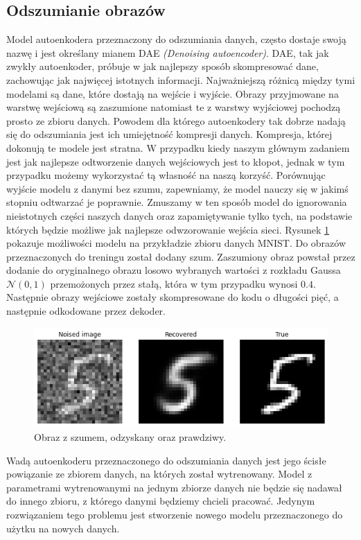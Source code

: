 \documentclass[a4paper,12pt]{book} %
\begin{document}
\subsection{Odszumianie obrazów}
Model autoenkodera przeznaczony do odszumiania danych, często dostaje swoją nazwę i jest określany mianem DAE \textit{(Denoising autoencoder)}. DAE, tak jak zwykły autoenkoder, próbuje w jak najlepszy sposób skompresować dane, zachowując jak najwięcej istotnych informacji. Najważniejszą różnicą między tymi modelami są dane, które dostają na wejście i wyjście. Obrazy przyjmowane na warstwę wejściową są zaszumione natomiast te z warstwy wyjściowej pochodzą prosto ze zbioru danych.
Powodem dla którego autoenkodery tak dobrze nadają się do odszumiania jest ich umiejętność kompresji danych. Kompresja, której dokonują te modele jest stratna. W przypadku kiedy naszym głównym zadaniem jest jak najlepsze odtworzenie danych wejściowych jest to kłopot, jednak w tym przypadku możemy wykorzystać tą własność na naszą korzyść. Porównując wyjście modelu z danymi bez szumu, zapewniamy, że model nauczy się w jakimś stopniu odtwarzać je poprawnie. Zmuszamy w ten sposób model do ignorowania nieistotnych części naszych danych oraz zapamiętywanie tylko tych, na podstawie których będzie możliwe jak najlepsze odwzorowanie wejścia sieci.
Rysunek \ref{fig:noisedae} pokazuje możliwości modelu na przykładzie zbioru danych MNIST. Do obrazów przeznaczonych do treningu został dodany szum. Zaszumiony obraz powstał przez dodanie do oryginalnego obrazu losowo wybranych wartości z rozkładu Gaussa $\mathcal{N}(0,1)$ przemożonych przez stałą, która w tym przypadku wynosi $0.4$. Następnie obrazy wejściowe zostały skompresowane do kodu o długości pięć, a następnie odkodowane przez dekoder. 
\begin{figure}[h!]
	\centering\includegraphics[width=14.5cm]{pictures/noised1.png}
	\caption{Obraz z szumem, odzyskany oraz prawdziwy.}
	\label{fig:noisedae}
\end{figure}

Wadą autoenkoderu przeznaczonego do odszumiania danych jest jego ścisłe powiązanie ze zbiorem danych, na których został wytrenowany. Model z parametrami wytrenowanymi na jednym zbiorze danych nie będzie się nadawał do innego zbioru, z którego danymi będziemy chcieli pracować. Jedynym rozwiązaniem tego problemu jest stworzenie nowego modelu przeznaczonego do użytku na nowych danych. 
\end{document}
